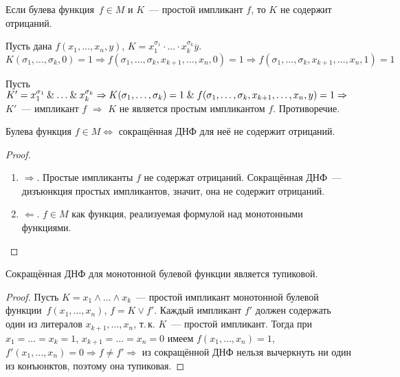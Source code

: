 \begin{theorem}
Если булева функция~$f \in M$ и $K$~--- простой импликант $f$, то $K$ не содержит отрицаний.
\end{theorem}
\begin{proofcontra}
Пусть дана $f(x_1, \ldots, x_n, y)$, $K = x_1^{\sigma_1} \cdot \ldots \cdot x_k^{\sigma_k} \overline y$.
\begin{equation*}
K(\sigma_1, \ldots, \sigma_k, 0) = 1 \Rightarrow
f(\sigma_1, \ldots, \sigma_k, x_{k+1}, \ldots, x_n, 0) = 1 \Rightarrow
f(\sigma_1, \ldots, \sigma_k, x_{k+1}, \ldots, x_n, 1) = 1
\end{equation*}

Пусть $K' = x_1^{\sigma_1} \mathbin{\&} \ldots \mathbin{\&} x_k^{\sigma_k} \Rightarrow
K(\sigma_1, \ldots, \sigma_k) = 1 \mathrel{\&} f(\sigma_1, \ldots, \sigma_k, x_{k+1}, \ldots, x_n, y) = 1 \Rightarrow$ $K'$~--- импликант $f$ $\Rightarrow$ $K$ не является простым импликантом $f$.
Противоречие.
\end{proofcontra}

\begin{theorem}
Булева функция $f \in M \Leftrightarrow$ сокращённая ДНФ для неё не содержит отрицаний.
\end{theorem}
\begin{proof}
\begin{enumerate}
	\item $\Rightarrow$. Простые импликанты $f$ не содержат отрицаний.
	Сокращённая ДНФ~--- дизъюнкция простых импликантов, значит, она не содержит отрицаний.
	\item $\Leftarrow$. $f \in M$ как функция, реализуемая формулой над монотонными функциями.
\end{enumerate}
\end{proof}

\begin{theorem}
Сокращённая ДНФ для монотонной булевой функции является тупиковой.
\end{theorem}
\begin{proof}
Пусть $K = x_1 \land \ldots \land x_k$~--- простой импликант монотонной булевой функции~$f(x_1, \ldots, x_n)$, $f = K \lor f'$.
Каждый импликант $f'$ должен содержать один из литералов $x_{k+1}, \ldots, x_n$, т.\,к. $K$~--- простой импликант.
Тогда при $x_1 = \ldots = x_k = 1$, $x_{k+1} = \ldots = x_n = 0$ имеем $f(x_1, \ldots, x_n) = 1$, $f'(x_1, \ldots, x_n) = 0 \Rightarrow f \neq f' \Rightarrow$ из сокращённой ДНФ нельзя вычеркнуть ни один из конъюнктов, поэтому она тупиковая.
\end{proof}

